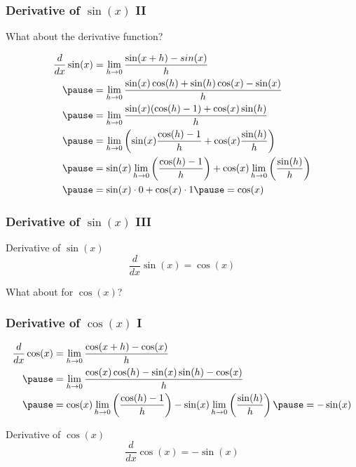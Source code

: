 \documentclass{ltx-talk}
\begin{document}
\begin{frame}
  \frametitle{Derivative of $\sin(x)$ II}

  What about the derivative function? \pause

  \begin{align}
    \dfrac{d}{dx} \sin(x) &= \lim\limits_{h \rightarrow 0} \dfrac{\sin(x + h) - sin(x)}{h} \\ \pause
                          &= \lim\limits_{h \rightarrow 0} \dfrac{\sin(x)\cos(h) + \sin(h)\cos(x) - \sin(x)}{h} \\ \pause
                          &= \lim\limits_{h \rightarrow 0} \dfrac{\sin(x)(\cos(h) - 1) + \cos(x) \sin(h)}{h} \\ \pause
                          &= \lim\limits_{h \rightarrow 0} \left(\sin(x) \dfrac{\cos(h) - 1}{h} + \cos(x) \dfrac{\sin(h)}{h}\right) \\ \pause
                          &= \sin(x) \lim\limits_{h \rightarrow 0} \left( \dfrac{\cos(h) - 1}{h} \right) + \cos(x) \lim\limits_{h \rightarrow 0} \left(\dfrac{\sin(h)}{h}\right) \\ \pause
                          &= \sin(x) \cdot 0 + \cos(x) \cdot 1 \pause = \cos(x)
  \end{align}
\end{frame}

\begin{frame}
  \frametitle{Derivative of $\sin(x)$ III}
  \begin{alertblock}{Derivative of $\sin(x)$}
    \begin{equation}
      \dfrac{d}{dx} \sin(x) = \cos(x)
    \end{equation}
  \end{alertblock} \pause

  What about for $\cos(x)$?
\end{frame}

\begin{frame}
  \frametitle{Derivative of $\cos(x)$ I}

  \begin{align}
    \dfrac{d}{dx} \cos(x) &= \lim\limits_{h \rightarrow 0} \dfrac{\cos(x + h) - \cos(x)}{h} \\ \pause
                          &= \lim\limits_{h \rightarrow 0} \dfrac{\cos(x)\cos(h) - \sin(x)\sin(h) - \cos(x)}{h} \\ \pause
                          &= \cos(x) \lim\limits_{h \rightarrow 0} \left( \dfrac{\cos(h) - 1}{h} \right) - \sin(x) \lim\limits_{h \rightarrow 0} \left(\dfrac{\sin(h)}{h} \right) \pause = - \sin(x)
  \end{align} \pause

  \begin{alertblock}{Derivative of $\cos(x)$}
    \begin{equation}
      \dfrac{d}{dx} \cos(x) = -\sin(x)
    \end{equation}
  \end{alertblock}
\end{frame}
\end{document}
